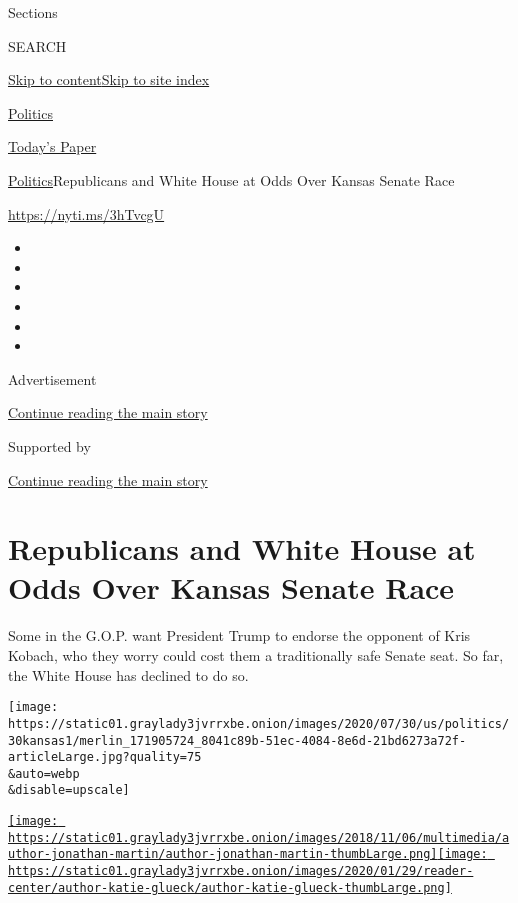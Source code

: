 Sections

SEARCH

\protect\hyperlink{site-content}{Skip to
content}\protect\hyperlink{site-index}{Skip to site index}

\href{https://www.nytimes3xbfgragh.onion/section/politics}{Politics}

\href{https://myaccount.nytimes3xbfgragh.onion/auth/login?response_type=cookie\&client_id=vi}{}

\href{https://www.nytimes3xbfgragh.onion/section/todayspaper}{Today's
Paper}

\href{/section/politics}{Politics}\textbar{}Republicans and White House
at Odds Over Kansas Senate Race

\href{https://nyti.ms/3hTvcgU}{https://nyti.ms/3hTvcgU}

\begin{itemize}
\item
\item
\item
\item
\item
\item
\end{itemize}

Advertisement

\protect\hyperlink{after-top}{Continue reading the main story}

Supported by

\protect\hyperlink{after-sponsor}{Continue reading the main story}

\hypertarget{republicans-and-white-house-at-odds-over-kansas-senate-race}{%
\section{Republicans and White House at Odds Over Kansas Senate
Race}\label{republicans-and-white-house-at-odds-over-kansas-senate-race}}

Some in the G.O.P. want President Trump to endorse the opponent of Kris
Kobach, who they worry could cost them a traditionally safe Senate seat.
So far, the White House has declined to do so.

\texttt{[image: https://static01.graylady3jvrrxbe.onion/images/2020/07/30/us/politics/30kansas1/merlin\_171905724\_8041c89b-51ec-4084-8e6d-21bd6273a72f-articleLarge.jpg?quality=75\\\&auto=webp\\\&disable=upscale]}

\href{https://www.nytimes3xbfgragh.onion/by/jonathan-martin}{\texttt{[image: https://static01.graylady3jvrrxbe.onion/images/2018/11/06/multimedia/author-jonathan-martin/author-jonathan-martin-thumbLarge.png]}}\href{https://www.nytimes3xbfgragh.onion/by/katie-glueck}{\texttt{[image: https://static01.graylady3jvrrxbe.onion/images/2020/01/29/reader-center/author-katie-glueck/author-katie-glueck-thumbLarge.png]}}

